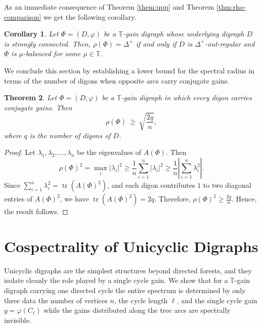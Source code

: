 \documentclass[12pt]{article}
\newtheorem{theorem}{Theorem}[section]
\newtheorem{corollary}[theorem]{Corollary}
\theoremstyle{definition}
\newcommand{\TT}{\mathbb{T}}
\newcommand{\vp}{\varphi}
\begin{document}
As an immediate consequence of Theorem \ref{them:upp} and Theorem \ref{thm:rho-comparison} we get the following corollary.

  \begin{corollary}
\label{cor:geom-bound-equality}
Let $\Phi=(D,\varphi)$ be a $\TT$-gain digraph whose underlying digraph $D$ is strongly connected. Then, $\rho(\Phi)=\Delta^+$ if and only if $D$ is $\Delta^+$-out-regular and $\Phi$ is $\mu$-balanced for some $\mu\in\TT$.
\end{corollary}


We conclude this section by establishing a lower bound for the spectral radius in terms of the number of digons when opposite arcs carry conjugate gains.

\begin{theorem}\label{thm:lower-digon}
Let $\Phi=(D,\vp)$ be a $\TT$-gain digraph in which every digon carries conjugate gains. Then
\[
  \rho(\Phi)\ \ge\ \sqrt{\frac{2q}{n}},
\]
 where $q$ is the number of digons of $D$.
\end{theorem}
\begin{proof}
Let $\lambda_1, \lambda_2, \ldots,\lambda_n$ be the eigenvalues of $A(\Phi)$. Then
\[
\rho(\Phi)^2
=
\max_i |\lambda_i|^2
\geq
\frac1n\sum_{i=1}^n |\lambda_i|^2
\geq
\frac1n\left|\sum_{i=1}^n \lambda_i^2\right|.
\]
Since
$\sum_{i=1}^n \lambda_i^2
=
\operatorname{tr}(A(\Phi)^2)$,
and each digon contributes $1$ to two diagonal entries of $A(\Phi)^2$, we have $\operatorname{tr}(A(\Phi)^2)=2q.$
Therefore,
$\rho(\Phi)^2
\geq
\frac{2q}{n}.$ Hence, the result follows.
\end{proof}

\section{Cospectrality of Unicyclic Digraphs} \label{sec4}

Unicyclic digraphs are the simplest structures beyond directed forests, and they isolate cleanly the role played by a single cycle gain. We show that for a $\TT$-gain digraph carrying one directed cycle the entire spectrum is determined by only three data the number of vertices $n$, the cycle length $\ell$, and the single cycle gain $g=\varphi(C_\ell)$ while the gains distributed along the tree arcs are spectrally invisible.
\end{document}
